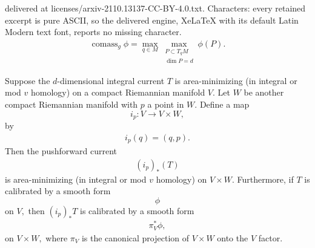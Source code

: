 \documentclass[10pt,a4paper]{amsart}
\newcommand{\cms}{\operatorname{comass}}
\newcommand{\du}{^\ast}
\newcommand{\pf}{_\ast}
\newcommand{\s}{\subset}
\begin{document}
delivered at licenses/arxiv-2110.13137-CC-BY-4.0.txt. Characters: every retained excerpt is pure ASCII, so the delivered engine, XeLaTeX with its default Latin Modern text font, reports no missing character.
	\begin{align}\label{eqcms}
		\cms_g\phi=\max_{q\in M}\max_{\substack{P\s T_qM\\ \dim P=d}}\phi(P).
	\end{align}

\begin{lem}\label{lemprod}
Suppose the $d$-dimensional integral current $T$ is area-minimizing (in integral or mod $v$ homology) on a compact  Riemannian manifold $V$. Let $W$ be another  compact Riemannian manifold with $p$ a point in $W$. Define a map $$i_p:V\to V\times W,$$ by
\begin{align*}
i_p(q)=(q,p).
\end{align*}
Then the pushforward current 
\begin{align*}
(i_p)\pf(T)
\end{align*}
is area-minimizing (in integral or mod $v$ homology) on $V\times W$. Furthermore, if $T$ is calibrated by a smooth form $$\phi$$ on $V,$ then $(i_p)\pf T$ is calibrated by a smooth form
\begin{align*}
\pi_V\du\phi,
\end{align*}on $V\times W,$ where $\pi_V$ is the canonical projection of $V\times W$ onto the $V$ factor.
\end{lem}
\end{document}
